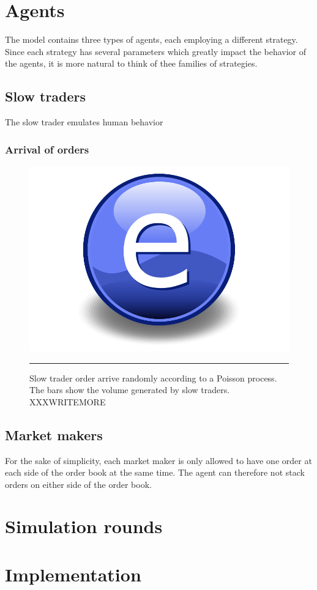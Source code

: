 \section{Agents}\label{section:agents}
The model contains three types of agents, each employing a different strategy. Since each strategy has several parameters which greatly impact the behavior of the agents, it is more natural to think of thee families of strategies.



\subsection{Slow traders}\label{section:slow_traders}
The slow trader emulates human behavior 


\subsubsection{Arrival of orders}

\begin{figure}[htbp]
	\centering
		\includegraphics{Figures/Electron.pdf}
		\rule{35em}{0.5pt}
	\caption[Slow trader order arrival]{Slow trader order arrive randomly according to a Poisson process. The bars show the volume generated by slow traders. XXXWRITEMORE}
	\label{fig:poisson_arrival}
\end{figure}


\subsection{Market makers}\label{section:market_maker}
For the sake of simplicity, each market maker is only allowed to have one order at each side of the order book at the same time. The agent can therefore not stack orders on either side of the order book. 

\section{Simulation rounds}


\section{Implementation}


